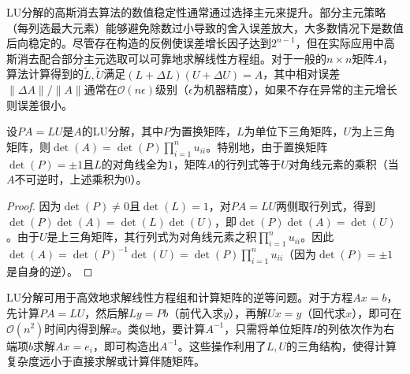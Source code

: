 \begin{note}
	LU分解的高斯消去算法的数值稳定性通常通过选择主元来提升。部分主元策略（每列选最大元素）能够避免除数过小导致的舍入误差放大，大多数情况下是数值后向稳定的。尽管存在构造的反例使误差增长因子达到$2^{n-1}$，但在实际应用中高斯消去配合部分主元选取可以可靠地求解线性方程组。对于一般的$n\times n$矩阵$A$，算法计算得到的$\tilde{L},\tilde{U}$满足$(L+\Delta L)(U+\Delta U) = A$，其中相对误差$\|\Delta A\|/\|A\|$通常在$\mathcal{O}(n\epsilon)$级别（$\epsilon$为机器精度），如果不存在异常的主元增长则误差很小。
\end{note}

\begin{proposition}\label{prop:LU-det}
	设$PA=LU$是$A$的LU分解，其中$P$为置换矩阵，$L$为单位下三角矩阵，$U$为上三角矩阵，则$\det(A) = \det(P)\prod_{i=1}^n u_{ii}$。特别地，由于置换矩阵$\det(P)=\pm1$且$L$的对角线全为$1$，矩阵$A$的行列式等于$U$对角线元素的乘积（当$A$不可逆时，上述乘积为$0$）。
\end{proposition}
\begin{proof}
	因为$\det(P)\neq0$且$\det(L)=1$，对$PA=LU$两侧取行列式，得到$\det(P)\det(A)=\det(L)\det(U)$，即$\det(P)\det(A)=\det(U)$。由于$U$是上三角矩阵，其行列式为对角线元素之积$\prod_{i=1}^n u_{ii}$。因此$\det(A) = \det(P)^{-1}\det(U) = \det(P)\prod_{i=1}^n u_{ii}$（因为$\det(P)=\pm1$是自身的逆）。
\end{proof}

\begin{note}
	LU分解可用于高效地求解线性方程组和计算矩阵的逆等问题。对于方程$Ax=b$，先计算$PA=LU$，然后解$Ly=Pb$（前代入求$y$），再解$Ux=y$（回代求$x$），即可在$\mathcal{O}(n^2)$时间内得到解$x$。类似地，要计算$A^{-1}$，只需将单位矩阵$I$的列依次作为右端项$b$求解$Ax=e_i$，即可构造出$A^{-1}$。这些操作利用了$L,U$的三角结构，使得计算复杂度远小于直接求解或计算伴随矩阵。
\end{note}

